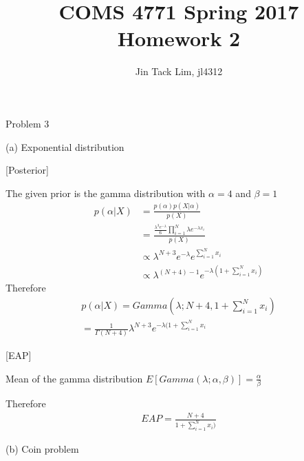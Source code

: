 \documentclass[11pt]{article}
\title{COMS 4771 Spring 2017 Homework 2}
\author{Jin Tack Lim, jl4312
  }
\date{%
  }
\theoremstyle{definition}
\begin{document}
\maketitle



\newcommand{\gau}[3]{
$\frac{1}{{ \sqrt {2\pi #3 ^2} }}e^{ \frac { - \left( {#1 - #2 } \right)^2 } {2#3 ^2}}$
}

\newcommand{\gauraw}[3]{
\frac{1}{{ \sqrt {2\pi #3 ^2} }}e^{ \frac { - \left( {#1 - #2 } \right)^2 } {2#3 ^2}}
}


Problem 3

(a) Exponential distribution

[Posterior]

The given prior is the gamma distribution with $\alpha = 4$ and $\beta = 1$
\begin{equation*}
\begin{split}
 p(\alpha | X ) & =  \frac{p(\alpha)p(X|\alpha)}{p(X)} \\
 & = \frac{\frac{\lambda^3 e^{-\lambda}}{6} \prod_{i=1}^{N} \lambda e^{-\lambda x_i}} {p(X)} \\
 & \propto {\lambda^{N+3} e^{-\lambda} e^{\sum_{i=1}^{N} x_i}} \\
 & \propto {\lambda^{(N+4) -1} e^{-\lambda(1+\sum_{i=1}^{N} x_i)} } 
\end{split}
\end{equation*}
Therefore
\begin{eqnarray}
 p(\alpha | X ) =  Gamma(\lambda; N+4, 1+\sum_{i=1}^{N} x_i) \nonumber \\
= \frac{1}{\Gamma(N+4)} \lambda^{N+3} e^{-\lambda(1+\sum_{i=1}^{N} x_i}
\end{eqnarray}


[EAP]

Mean of the gamma distribution $E[Gamma(\lambda;\alpha, \beta)] = \frac{\alpha}{\beta}$

Therefore
\begin{eqnarray}
EAP = \frac{N+4}{1+\sum_{i=1}^{N} x_i)}
\end{eqnarray}

(b) Coin problem
\end{document}
